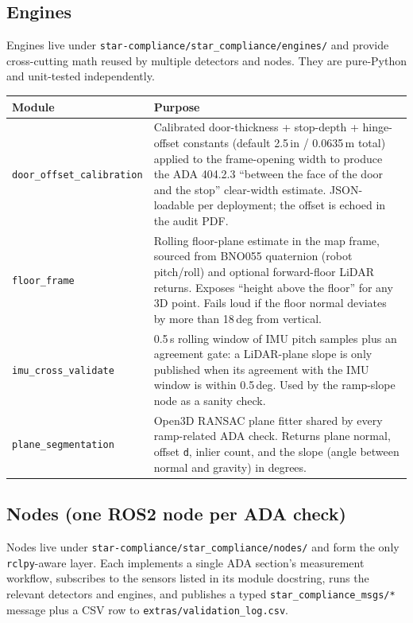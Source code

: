 \subsection{Engines}

Engines live under \texttt{star-compliance/star\_compliance/engines/}
and provide cross-cutting math reused by multiple detectors and
nodes. They are pure-Python and unit-tested independently.

\begin{center}
\begin{tabular}{|p{3.8cm}|p{10.6cm}|}
\hline
\textbf{Module} & \textbf{Purpose} \\
\hline
\texttt{door\_offset\_calibration} & Calibrated door-thickness + stop-depth + hinge-offset constants (default 2.5\,in / 0.0635\,m total) applied to the frame-opening width to produce the ADA 404.2.3 ``between the face of the door and the stop'' clear-width estimate. JSON-loadable per deployment; the offset is echoed in the audit PDF. \\
\hline
\texttt{floor\_frame}              & Rolling floor-plane estimate in the map frame, sourced from BNO055 quaternion (robot pitch/roll) and optional forward-floor LiDAR returns. Exposes ``height above the floor'' for any 3D point. Fails loud if the floor normal deviates by more than 18\,deg from vertical. \\
\hline
\texttt{imu\_cross\_validate}      & 0.5\,s rolling window of IMU pitch samples plus an agreement gate: a LiDAR-plane slope is only published when its agreement with the IMU window is within 0.5\,deg. Used by the ramp-slope node as a sanity check. \\
\hline
\texttt{plane\_segmentation}       & Open3D RANSAC plane fitter shared by every ramp-related ADA check. Returns plane normal, offset \texttt{d}, inlier count, and the slope (angle between normal and gravity) in degrees. \\
\hline
\end{tabular}
\end{center}

\subsection{Nodes (one ROS2 node per ADA check)}

Nodes live under \texttt{star-compliance/star\_compliance/nodes/} and
form the only \texttt{rclpy}-aware layer. Each implements a single
ADA section's measurement workflow, subscribes to the sensors listed
in its module docstring, runs the relevant detectors and engines, and
publishes a typed \texttt{star\_compliance\_msgs/*} message plus a
CSV row to \texttt{extras/validation\_log.csv}.

